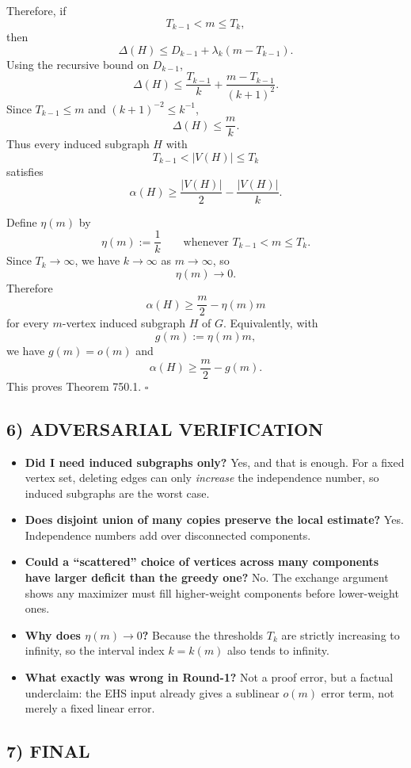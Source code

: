 Therefore, if
\[
T_{k-1}<m\le T_k,
\]
then
\[
\Delta(H)\le D_{k-1}+\lambda_k(m-T_{k-1}).
\]
Using the recursive bound on $D_{k-1}$,
\[
\Delta(H)\le \frac{T_{k-1}}{k}+\frac{m-T_{k-1}}{(k+1)^2}.
\]
Since $T_{k-1}\le m$ and $(k+1)^{-2}\le k^{-1}$,
\[
\Delta(H)\le \frac{m}{k}.
\]
Thus every induced subgraph $H$ with
\[
T_{k-1}<|V(H)|\le T_k
\]
satisfies
\[
\alpha(H)\ge \frac{|V(H)|}{2}-\frac{|V(H)|}{k}.
\]

Define $\eta(m)$ by
\[
\eta(m):=\frac1k\qquad\text{whenever }T_{k-1}<m\le T_k.
\]
Since $T_k\to\infty$, we have $k\to\infty$ as $m\to\infty$, so
\[
\eta(m)\to 0.
\]
Therefore
\[
\alpha(H)\ge \frac m2-\eta(m)m
\]
for every $m$-vertex induced subgraph $H$ of $G$.
Equivalently, with
\[
g(m):=\eta(m)m,
\]
we have $g(m)=o(m)$ and
\[
\alpha(H)\ge \frac m2-g(m).
\]
This proves Theorem 750.1. \hfill $\square$

\subsection*{6) ADVERSARIAL VERIFICATION}

\begin{itemize}
\item \textbf{Did I need induced subgraphs only?} Yes, and that is enough. For a fixed vertex set, deleting edges can only \emph{increase} the independence number, so induced subgraphs are the worst case.
\item \textbf{Does disjoint union of many copies preserve the local estimate?} Yes. Independence numbers add over disconnected components.
\item \textbf{Could a ``scattered'' choice of vertices across many components have larger deficit than the greedy one?} No. The exchange argument shows any maximizer must fill higher-weight components before lower-weight ones.
\item \textbf{Why does $\eta(m)\to 0$?} Because the thresholds $T_k$ are strictly increasing to infinity, so the interval index $k=k(m)$ also tends to infinity.
\item \textbf{What exactly was wrong in Round-1?} Not a proof error, but a factual underclaim: the EHS input already gives a sublinear $o(m)$ error term, not merely a fixed linear error.
\end{itemize}

\subsection*{7) FINAL}


